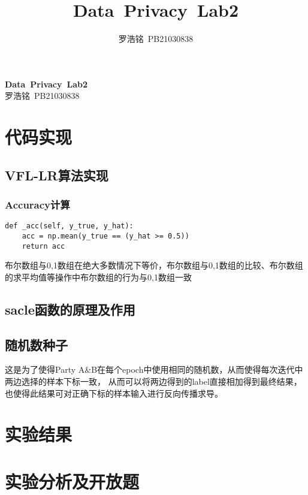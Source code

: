 \documentclass[twoside,11pt]{article}
\title{Data\ Privacy\ Lab2}
\author{罗浩铭\ PB21030838}
\begin{document}
\fancyhf{} %
\fancyfoot[C]{\thepage} %

\renewcommand{\headrulewidth}{0pt} %

\begin{center}
    \textbf{\LARGE{Data\ Privacy\ Lab2}}\\
    \vspace{0.1cm}
    \large{罗浩铭\ PB21030838}
\end{center}



\section{代码实现}
\subsection{VFL-LR算法实现}

\subsubsection{Accuracy计算}

\begin{lstlisting}
def _acc(self, y_true, y_hat):
    acc = np.mean(y_true == (y_hat >= 0.5))
    return acc
\end{lstlisting}

布尔数组与0,1数组在绝大多数情况下等价，布尔数组与0,1数组的比较、布尔数组的求平均值等操作中布尔数组的行为与0,1数组一致


\subsection{sacle函数的原理及作用}



\subsection{随机数种子}

这是为了使得Party A&B在每个epoch中使用相同的随机数，从而使得每次迭代中两边选择的样本下标一致，
从而可以将两边得到的label直接相加得到最终结果，也使得此结果可对正确下标的样本输入进行反向传播求导。


\section{实验结果}




\section{实验分析及开放题}
\end{document}
